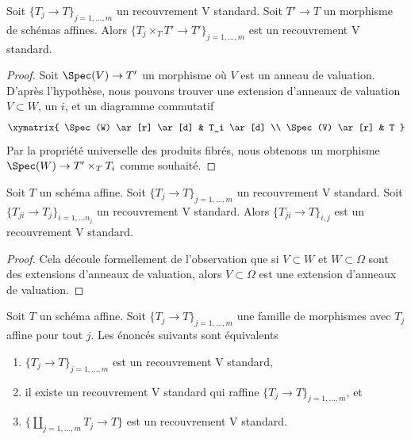 \begin{lemma}
\label{lemma-base-change-standard-V}
Soit $\{T_j \to T\}_{j = 1, \ldots, m}$ un recouvrement V standard. Soit $T' \to T$ un morphisme de schémas affines. Alors $\{T_j \times_T T' \to T'\}_{j = 1, \ldots, m}$ est un recouvrement V standard.
\end{lemma}

\begin{proof}
Soit $\Spec(V) \to T'$ un morphisme où $V$ est un anneau de valuation. D'après l'hypothèse, nous pouvons trouver une extension d'anneaux de valuation $V \subset W$, un $i$, et un diagramme commutatif
$$
\xymatrix{
\Spec(W) \ar[r] \ar[d] & T_i \ar[d] \\
\Spec(V) \ar[r] & T
}
$$
Par la propriété universelle des produits fibrés, nous obtenons un morphisme\newline $\Spec(W) \to T' \times_T T_i$ comme souhaité.
\end{proof}

\begin{lemma}
\label{lemma-composition-standard-V}
Soit $T$ un schéma affine. Soit $\{T_j \to T\}_{j = 1, \ldots, m}$ un recouvrement V standard. Soit $\{T_{ji} \to T_j\}_{i = 1, \ldots n_j}$ un recouvrement V standard. Alors $\{T_{ji} \to T\}_{i, j}$ est un recouvrement V standard.
\end{lemma}

\begin{proof}
Cela découle formellement de l'observation que si $V \subset W$ et $W \subset \Omega$ sont des extensions d'anneaux de valuation, alors $V \subset \Omega$ est une extension d'anneaux de valuation.
\end{proof}

\begin{lemma}
\label{lemma-refine-standard-V}
Soit $T$ un schéma affine. Soit $\{T_j \to T\}_{j = 1, \ldots, m}$ une famille de morphismes avec $T_j$ affine pour tout $j$. Les énoncés suivants sont équivalents
\begin{enumerate}
\item $\{T_j \to T\}_{j = 1, \ldots, m}$ est un recouvrement V standard,
\item il existe un recouvrement V standard qui raffine $\{T_j \to T\}_{j = 1, \ldots, m}$, et
\item $\{\coprod_{j = 1, \ldots, m} T_j \to T\}$ est un recouvrement V standard.
\end{enumerate}
\end{lemma}


